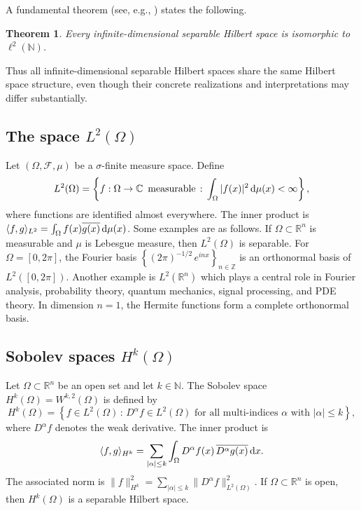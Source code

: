 \documentclass[12pt]{amsart}
\newcommand{\D}[1]{\mbox{\rm #1}}
\newcommand{\dd}{\D{d}}
\numberwithin{equation}{section}
\newtheorem{theorem}{Theorem}[section]
\begin{document}
A fundamental theorem (see, e.g., \cite[Theorem 5.4.8, p.130]{hong2004real}) states the following. 
\begin{theorem}
Every infinite-dimensional separable Hilbert space is isomorphic to $\ell^2(\mathbb{N})$.
\end{theorem}

Thus all infinite-dimensional separable Hilbert spaces share the same Hilbert space structure, even though their concrete realizations and interpretations may differ substantially.


\subsection{The space \texorpdfstring{$L^2(\Omega)$}{L2(Omega)}}


Let $(\Omega,\mathcal F,\mu)$ be a $\sigma$-finite measure space. Define
\[
    L^2(\Omega) = \left\{ f:\Omega\to\mathbb{C} \, \text{ measurable} \, : \, \int_\Omega |f(x)|^2\,\dd\mu(x)<\infty \right\},
\]
where functions are identified almost everywhere. The inner product is $\langle f,g\rangle_{L^2} = \int_\Omega f(x)\overline{g(x)}\,\dd\mu(x)$.  Some examples are as follows.  
If $\Omega\subset\mathbb{R}^n$ is measurable and $\mu$ is Lebesgue measure, then $L^2(\Omega)$ is separable. For $\Omega=[0,2\pi]$, the Fourier basis $\left\{ (2\pi)^{-1/2}\,e^{inx} \right\}_{n\in\mathbb Z}$ 
is an orthonormal basis of $L^2([0,2\pi])$. 
Another example is  $L^2(\mathbb{R}^n)$ which plays a central role in Fourier analysis, probability theory, quantum mechanics, signal processing, and PDE theory. In dimension $n=1$, the Hermite functions form a complete orthonormal basis. 


\subsection{Sobolev spaces \texorpdfstring{$H^k(\Omega)$}{Hk(Omega)}}

Let $\Omega\subset\mathbb{R}^n$ be an open set and let $k\in\mathbb{N}$. 
The Sobolev space $H^k(\Omega) = W^{k,2}(\Omega)$ is defined by
\[
    H^k(\Omega) = \left\{ f\in L^2(\Omega) \,:\, D^\alpha f\in L^2(\Omega) \text{ for all multi-indices } \alpha \text{ with } |\alpha|\le k \right\},
\]
where $D^\alpha f$ denotes the weak derivative. 
The inner product is
\[
    \langle f,g\rangle_{H^k} = \sum_{|\alpha|\le k} \int_\Omega D^\alpha f(x)\, \overline{D^\alpha g(x)} \,\dd x.
\]
The associated norm is $\|f\|_{H^k}^2 = \sum_{|\alpha|\le k} \|D^\alpha f\|_{L^2(\Omega)}^2$. 
If $\Omega\subset\mathbb{R}^n$ is open, then $H^k(\Omega)$ is a separable Hilbert space. 
\end{document}
